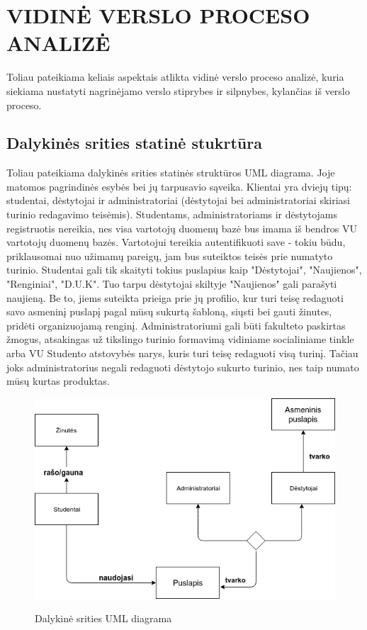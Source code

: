 \documentclass{VUMIFPSkursinis}
\begin{document}
\section{VIDINĖ VERSLO PROCESO ANALIZĖ}
Toliau pateikiama keliais aspektais atlikta vidinė verslo proceso analizė, kuria siekiama
nustatyti nagrinėjamo verslo stiprybes ir silpnybes, kylančias iš verslo proceso.
\subsection{Dalykinės srities statinė stukrtūra}
 Toliau pateikiama dalykinės srities statinės struktūros UML diagrama. Joje matomos pagrindinės esybės bei jų tarpusavio sąveika. Klientai yra dviejų tipų: studentai, dėstytojai ir administratoriai (dėstytojai bei administratoriai skiriasi turinio redagavimo teisėmis). Studentams, administratoriams ir dėstytojams registruotis nereikia, nes visa vartotojų duomenų bazė bus imama iš bendros VU vartotojų duomenų bazės. Vartotojui tereikia autentifikuoti save - tokiu būdu, priklausomai nuo užimamų pareigų, jam bus suteiktos teisės prie numatyto turinio. Studentai gali tik skaityti tokius puslapius kaip "Dėstytojai", "Naujienos", "Renginiai", "D.U.K". Tuo tarpu dėstytojai skiltyje "Naujienos" gali parašyti naujieną. Be to, jiems suteikta prieiga prie jų profilio, kur turi teisę redaguoti savo asmeninį puslapį pagal mūsų sukurtą šabloną, siųsti bei gauti žinutes, pridėti organizuojamą renginį. Administratoriumi gali būti fakulteto paskirtas žmogus, atsakingas už tikslingo turinio formavimą vidiniame socialiniame tinkle arba VU Studento atstovybės narys, kuris turi teisę redaguoti visą turinį. Tačiau joks administratorius negali redaguoti dėstytojo sukurto turinio, nes taip numato mūsų kurtas produktas.\\

\begin{figure}[H]
\centering
\includegraphics[width=\linewidth]{img/dalykine.png}
\label{fig:dalykine}
\caption{Dalykinė srities UML diagrama}
\end{figure}
\end{document}
